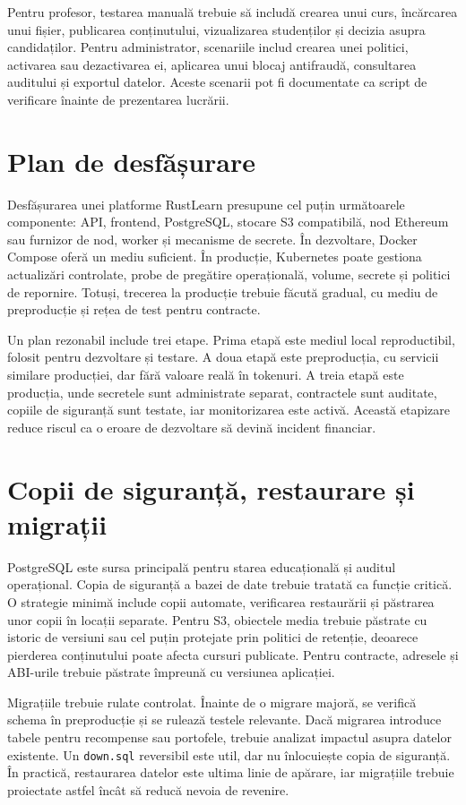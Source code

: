Pentru profesor, testarea manuală trebuie să includă crearea unui curs, încărcarea unui fișier, publicarea conținutului, vizualizarea studenților și decizia asupra candidaților. Pentru administrator, scenariile includ crearea unei politici, activarea sau dezactivarea ei, aplicarea unui blocaj antifraudă, consultarea auditului și exportul datelor. Aceste scenarii pot fi documentate ca script de verificare înainte de prezentarea lucrării.

\section{Plan de desfășurare}
Desfășurarea unei platforme RustLearn presupune cel puțin următoarele componente: API, frontend, PostgreSQL, stocare S3 compatibilă, nod Ethereum sau furnizor de nod, worker și mecanisme de secrete. În dezvoltare, Docker Compose oferă un mediu suficient. În producție, Kubernetes poate gestiona actualizări controlate, probe de pregătire operațională, volume, secrete și politici de repornire. Totuși, trecerea la producție trebuie făcută gradual, cu mediu de preproducție și rețea de test pentru contracte.

Un plan rezonabil include trei etape. Prima etapă este mediul local reproductibil, folosit pentru dezvoltare și testare. A doua etapă este preproducția, cu servicii similare producției, dar fără valoare reală în tokenuri. A treia etapă este producția, unde secretele sunt administrate separat, contractele sunt auditate, copiile de siguranță sunt testate, iar monitorizarea este activă. Această etapizare reduce riscul ca o eroare de dezvoltare să devină incident financiar.

\section{Copii de siguranță, restaurare și migrații}
PostgreSQL este sursa principală pentru starea educațională și auditul operațional. Copia de siguranță a bazei de date trebuie tratată ca funcție critică. O strategie minimă include copii automate, verificarea restaurării și păstrarea unor copii în locații separate. Pentru S3, obiectele media trebuie păstrate cu istoric de versiuni sau cel puțin protejate prin politici de retenție, deoarece pierderea conținutului poate afecta cursuri publicate. Pentru contracte, adresele și ABI-urile trebuie păstrate împreună cu versiunea aplicației.

Migrațiile trebuie rulate controlat. Înainte de o migrare majoră, se verifică schema în preproducție și se rulează testele relevante. Dacă migrarea introduce tabele pentru recompense sau portofele, trebuie analizat impactul asupra datelor existente. Un \texttt{down.sql} reversibil este util, dar nu înlocuiește copia de siguranță. În practică, restaurarea datelor este ultima linie de apărare, iar migrațiile trebuie proiectate astfel încât să reducă nevoia de revenire.

